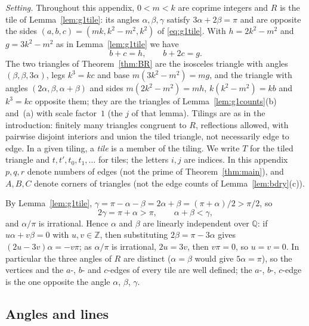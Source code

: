 \documentclass[11pt]{amsart}
\theoremstyle{remark}
\newcommand{\Z}{\mathbb{Z}}
\begin{document}
\emph{Setting.} Throughout this appendix, $0<m<k$ are coprime integers and $R$ is the tile of Lemma~\ref{lem:g1tile}: its angles $\alpha,\beta,\gamma$ satisfy $3\alpha+2\beta=\pi$ and are opposite the sides $(a,b,c)=(mk,k^2-m^2,k^2)$ of \eqref{eq:g1tile}. With $h=2k^2-m^2$ and $g=3k^2-m^2$ as in Lemma~\ref{lem:g1tile} we have
\[
b+c=h,\qquad b+2c=g .
\]
The two triangles of Theorem~\ref{thm:BR} are the isosceles triangle with angles $(\beta,\beta,3\alpha)$, legs $k^3=kc$ and base $m(3k^2-m^2)=mg$, and the triangle with angles $(2\alpha,\beta,\alpha+\beta)$ and sides $m(2k^2-m^2)=mh$, $k(k^2-m^2)=kb$ and $k^3=kc$ opposite them; they are the triangles of Lemma~\ref{lem:g1counts}(b) and~(a) with scale factor~$1$ (the $j$ of that lemma). Tilings are as in the introduction: finitely many triangles congruent to $R$, reflections allowed, with pairwise disjoint interiors and union the tiled triangle, not necessarily edge to edge. In a given tiling, a \emph{tile} is a member of the tiling. We write $T$ for the tiled triangle and $t,t',t_0,t_1,\dots$ for tiles; the letters $i,j$ are indices. In this appendix $p,q,r$ denote numbers of edges (not the prime of Theorem~\ref{thm:main}), and $A,B,C$ denote corners of triangles (not the edge counts of Lemma~\ref{lem:bdry}(c)).

By Lemma~\ref{lem:g1tile}, $\gamma=\pi-\alpha-\beta=2\alpha+\beta=(\pi+\alpha)/2>\pi/2$, so
\begin{equation}\label{eq:app-gamma}
2\gamma=\pi+\alpha>\pi,\qquad \alpha+\beta<\gamma,
\end{equation}
and $\alpha/\pi$ is irrational. Hence $\alpha$ and $\beta$ are linearly independent over $\mathbb{Q}$: if $u\alpha+v\beta=0$ with $u,v\in\Z$, then substituting $2\beta=\pi-3\alpha$ gives $(2u-3v)\alpha=-v\pi$; as $\alpha/\pi$ is irrational, $2u=3v$, then $v\pi=0$, so $u=v=0$. In particular the three angles of $R$ are distinct ($\alpha=\beta$ would give $5\alpha=\pi$), so the vertices and the $a$-, $b$- and $c$-edges of every tile are well defined; the $a$-, $b$-, $c$-edge is the one opposite the angle $\alpha$, $\beta$, $\gamma$.

\subsection{Angles and lines}
\end{document}

